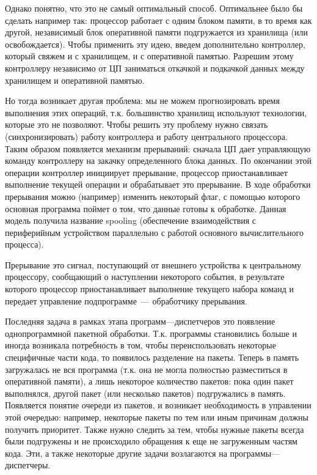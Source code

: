Однако понятно, что это не самый оптимальный способ. Оптимальнее было бы сделать
например так: процессор работает с одним блоком памяти, в то время как другой,
независимый блок оперативной памяти подгружается из хранилища (или
освобождается). Чтобы применить эту идею, введем дополнительно контроллер,
который свяжем и с хранилищем, и с оперативной памятью. Разрешим этому
контроллеру независимо от ЦП заниматься откачкой и подкачкой данных между
хранилищем и оперативной памятью.

Но тогда возникает другая проблема: мы не можем прогнозировать время выполнения
этих операций, т.к. большинство хранилищ используют технологии, которые это не
позволяют. Чтобы решить эту проблему нужно связать (синхронизировать) работу
контроллера и работу центрального процессора. Таким образом появляется механизм
прерываний: сначала ЦП дает управляющую команду контроллеру на закачку
определенного блока данных. По окончании этой операции контроллер инициирует
прерывание, процессор приостанавливает выполнение текущей операции и
обрабатывает это прерывание. В ходе обработки прерывания можно (например)
изменить некоторый флаг, с помощью которого основная программа поймет о том, что
данные готовы к обработке. Данная модель получила название spooling (обеспечение
взаимодействия с периферийным устройством параллельно с работой основного
вычислительного процесса).

\begin{definition}
  Прерывание это сигнал, поступающий от внешнего устройства к центральному
  процессору, сообщающий о наступлении некоторого события, в результате которого
  процессор приостанавливает выполнение текущего набора команд и передает
  управление подпрограмме~--- обработчику прерывания.
\end{definition}

Последняя задача в рамках этапа программ---диспетчеров это появление
однопрограммной пакетной обработки. Т.к. программы становились больше и иногда
возникала потребность в том, чтобы переиспользовать некоторые специфичные части
кода, то появилось разделение на пакеты. Теперь в память загружалась не вся
программа (т.к. она не могла полностью разместиться в оперативной памяти), а
лишь некоторое количество пакетов: пока один пакет выполнялся, другой пакет (или
несколько пакетов) подгружались в память. Появляется понятие очереди из пакетов,
и возникает необходимость в управлении этой очередью: например, некоторые пакеты
по тем или иным причинам должны получить приоритет. Также нужно следить за тем,
чтобы нужные пакеты всегда были подгружены и не происходило обращения к еще не
загруженным частям кода. Эти, а также некоторые другие задачи возлагаются на
программы---диспетчеры.

